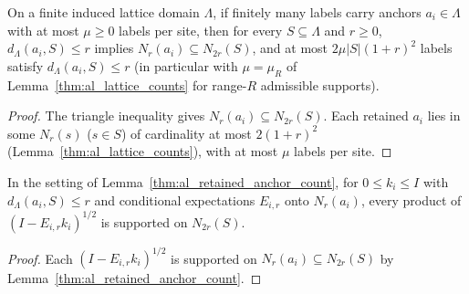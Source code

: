 \begin{lemma}
    \label{thm:al_retained_anchor_count}
    \leanok
    On a finite induced lattice domain $\Lambda$, if finitely many labels
    carry anchors $a_i\in\Lambda$ with at most $\mu\ge0$ labels per site,
    then for every $S\subseteq\Lambda$ and $r\ge0$, $d_\Lambda(a_i,S)\le r$
    implies $N_r(a_i)\subseteq N_{2r}(S)$, and at most $2\mu|S|(1+r)^2$
    labels satisfy $d_\Lambda(a_i,S)\le r$ (in particular with $\mu=\mu_R$
    of Lemma~\ref{thm:al_lattice_counts} for range-$R$ admissible
    supports).
\end{lemma}
\begin{proof}\leanok
    The triangle inequality gives $N_r(a_i)\subseteq N_{2r}(S)$. Each
    retained $a_i$ lies in some $N_r(s)$ ($s\in S$) of cardinality at most
    $2(1+r)^2$ (Lemma~\ref{thm:al_lattice_counts}), with at most $\mu$
    labels per site.
\end{proof}

\begin{lemma}
    \label{thm:al_truncated_product_support}
    \leanok
    In the setting of Lemma~\ref{thm:al_retained_anchor_count}, for
    $0\le k_i\le I$ with $d_\Lambda(a_i,S)\le r$ and conditional
    expectations $E_{i,r}$ onto $N_r(a_i)$, every product of
    $(I-E_{i,r}k_i)^{1/2}$ is supported on $N_{2r}(S)$.
\end{lemma}
\begin{proof}\leanok
    Each $(I-E_{i,r}k_i)^{1/2}$ is supported on
    $N_r(a_i)\subseteq N_{2r}(S)$ by
    Lemma~\ref{thm:al_retained_anchor_count}.
\end{proof}

